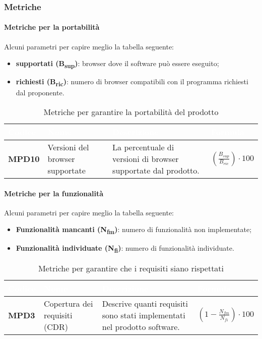 \subsubsection{Metriche}
\paragraph{Metriche per la portabilità}
Alcuni parametri per capire meglio la tabella seguente:
\begin{itemize}
\item \textbf{ supportati (B\textsubscript{sup})}: browser dove il software può essere eseguito;
	\item \textbf{ richiesti (B\textsubscript{ric})}: numero di browser compatibili con il programma richiesti dal proponente.
\end{itemize}

\renewcommand{\arraystretch}{1.5}
\renewcommand\extrarowheight{1.5pt}
\begin{longtable}{C{1.5cm} C{4.5cm} C{5.5cm} C{5cm}}
		\textcolor{white}{\textbf{Codice}} & 
		\textcolor{white}{\textbf{Nome}} & 
		\textcolor{white}{\textbf{Descrizione}} & 
		\textcolor{white}{\textbf{Formula}} \\
		\endfirsthead
	    \endfoot
	    \caption{Metriche per garantire la portabilità del prodotto}
	    \endlastfoot
		\textbf{MPD10} & 
		Versioni del browser supportate & 
		La percentuale di versioni di browser supportate dal prodotto. &
		$(\frac{B_{sup}}{B_{ric}}) \cdot 100 $  \\
\end{longtable} 

\paragraph{Metriche per la funzionalità}

Alcuni parametri per capire meglio la tabella seguente:
\begin{itemize}
\item \textbf{Funzionalità mancanti (N\textsubscript{fm})}: numero di funzionalità non implementate;
\item \textbf{Funzionalità individuate (N\textsubscript{fi})}: numero di funzionalità individuate.

\end{itemize}
\renewcommand{\arraystretch}{1.5}
\renewcommand\extrarowheight{1.5pt}
\begin{longtable}{C{1.5cm} C{4.5cm} C{5.5cm} C{5cm}}
		\textcolor{white}{\textbf{Codice}} & 
		\textcolor{white}{\textbf{Nome}} & 
		\textcolor{white}{\textbf{Descrizione}} & 
		\textcolor{white}{\textbf{Formula}} \\
		\endfirsthead
	    \endfoot
	    \caption{Metriche per garantire che i requisiti siano rispettati}
	    \endlastfoot
		\textbf{MPD3} & 
		Copertura dei requisiti (CDR) & 
		Descrive quanti requisiti sono stati implementati nel prodotto software. &
		$(1 - \frac{N_{fm}}{N_{fi}}) \cdot 100 $ \\
\end{longtable} 

